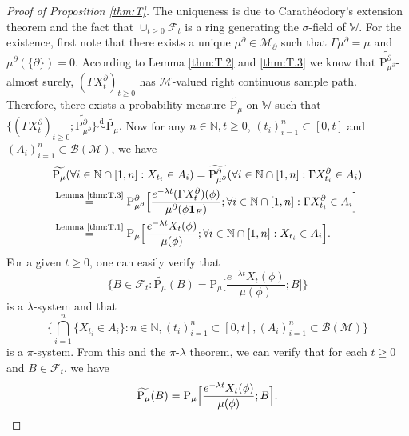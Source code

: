 \documentclass[12pt,a4paper]{amsart}
\numberwithin{equation}{section}
\theoremstyle{plain}
\theoremstyle{definition}
\theoremstyle{remark}
\begin{document}
\begin{proof}[Proof of Proposition \ref{thm:T}]
	The uniqueness is due to Carath\'eodory's extension theorem and the fact that $\cup_{t\geq 0}\mathscr F_t$ is a ring generating the $\sigma$-field of $\mathbb W$.
	For the existence, first note that there exists a unique $\mu^\partial \in \mathcal M_\partial$ such that $\Gamma \mu^\partial = \mu$ and $\mu^{\partial}(\{\partial\}) = 0$.
	According to Lemma \ref{thm:T.2} and \ref{thm:T.3} we know that $\widetilde {\mathrm P_{\mu^\partial}^\partial}$-almost surely, $(\Gamma X^\partial_t)_{t\geq 0}$ has $\mathcal M$-valued right continuous sample path.
	Therefore, there exists a probability measure $\widetilde{\mathrm P_\mu}$ on $\mathbb W$ such that
$
	\{(\Gamma X^\partial_t)_{t\geq 0}; \widetilde {\mathrm P^\partial_{\mu^\partial}}\} \overset{\text{d}}\sim \widetilde {\mathrm P_\mu}.
$
	Now for any $n\in \mathbb N, t\geq 0$, $(t_i)_{i=1}^n \subset [0,t]$ and $(A_i)_{i=1}^n\subset \mathscr B(\mathcal M)$, we have
\begin{align}
	&\widetilde {\mathrm P_\mu}(\forall i\in \mathbb N\cap [1,n]: X_{t_i}\in A_i)
	= \widetilde {\mathrm P_{\mu^\partial}^\partial} (\forall i\in \mathbb N\cap [1,n]: \Gamma X^\partial_{t_i}\in A_i)
	\\ &\overset{\text{Lemma \ref{thm:T.3}}}= \mathrm P_{\mu^\partial}^\partial \Big[\frac{e^{-\lambda t}(\Gamma X^\partial_t)(\phi)}{\mu^\partial(\phi\mathbf 1_E)};\forall i\in \mathbb N\cap [1,n]: \Gamma X_{t_i}^{\partial}\in A_i\Big]
	\\ & \overset{\text{Lemma \ref{thm:T.1}}}= \mathrm P_\mu \Big[\frac{e^{-\lambda t}X_t(\phi)}{\mu(\phi)};\forall i\in \mathbb N\cap [1,n]: X_{t_i}\in A_i\Big].
\end{align}
	For a given $t\geq 0$, one can easily verify that
\begin{equation}
	\Big\{B \in \mathscr F_t: \widetilde {\mathrm P_\mu}(B) = \mathrm P_\mu \Big[\frac{e^{-\lambda t}X_t(\phi)}{\mu(\phi)}; B\Big]\Big\}
\end{equation}
	is a $\lambda$-system and that
\begin{equation}
	\Big\{ \bigcap_{i=1}^n\{X_{t_i}\in A_i\}: n\in \mathbb N, (t_i)_{i=1}^n \subset [0,t], (A_i)_{i=1}^n\subset \mathscr B(\mathcal M) \Big\}
\end{equation}
	is a $\pi$-system.
	From this and the $\pi$-$\lambda$ theorem, we can verify that for each $t\geq 0$ and $B \in \mathscr F_t$, we have
\[
	\widetilde {\mathrm P_\mu}(B)
	= \mathrm P_\mu\Big[\frac{e^{-\lambda t}X_t(\phi)}{\mu(\phi)}; B\Big].
	\qedhere
\]
\end{proof}
\end{document}
